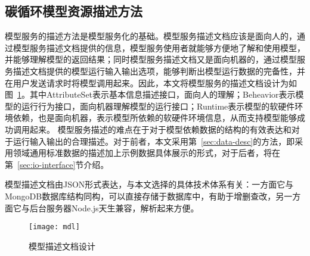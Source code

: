 \subsection{碳循环模型资源描述方法}
模型服务的描述方法是模型服务化的基础。模型服务描述文档应该是面向人的，通过模型服务描述文档提供的信息，模型服务使用者就能够方便地了解和使用模型，并能够理解模型的返回结果；同时模型服务描述文档又是面向机器的，通过模型服务描述文档提供的模型运行输入输出选项，能够判断出模型运行数据的完备性，并在用户发送请求时将模型调用起来。因此，本文将模型服务的描述文档设计为如图~\ref{fig:mdl}。其中AttributeSet表示基本信息描述接口，面向人的理解；Beheavior表示模型的运行行为接口，面向机器理解模型的运行接口；Runtime表示模型的软硬件环境依赖，也是面向机器，表示模型所依赖的软硬件环境信息，从而支持模型能够成功调用起来。
模型服务描述的难点在于对于模型依赖数据的结构的有效表达和对于运行输入输出的合理描述。对于前者，本文采用第~\ref{sec:data-desc}的方法，即采用领域通用标准数据的描述加上示例数据具体展示的形式，对于后者，将在第~\ref{sec:io-interface}节介绍。


模型描述文档由JSON形式表达，与本文选择的具体技术体系有关：一方面它与MongoDB数据库结构同构，可以直接存储于数据库中，有助于增删查改，另一方面它与后台服务器Node.js天生兼容，解析起来方便。

\begin{figure}[!htbp]
    \centering
    \texttt{[image: mdl]}
    \caption{模型描述文档设计}
    \label{fig:mdl}
\end{figure}

